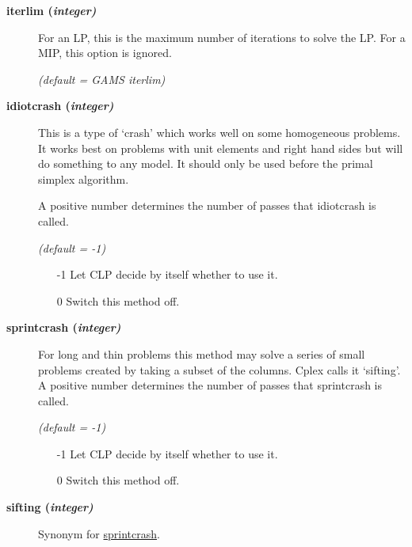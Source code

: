 \begin{description}

\item[\label{iterlim}\hypertarget{iterlim}
{\textbf{iterlim (\slshape{integer})}}]\hspace{1.0in}

For an LP, this is the maximum number of iterations to solve the LP.
For a MIP, this option is ignored.

\textsl{(default = GAMS iterlim)}

\item[\label{idiotcrash}\hypertarget{idiotcrash}
{\textbf{idiotcrash (\slshape{integer})}}]\hspace{1.0in}

This is a type of `crash' which works well on some homogeneous problems.
It works best on problems with unit elements and right hand sides but will do something to any model.
It should only be used before the primal simplex algorithm.

A positive number determines the number of passes that idiotcrash is called.

\textsl{(default = -1)}
\begin{itemize}
\item[-1] 
Let CLP decide by itself whether to use it.
\item[0] 
Switch this method off.
\end{itemize}

\item[\label{sprintcrash}\hypertarget{sprintcrash}
{\textbf{sprintcrash (\slshape{integer})}}]\hspace{1.0in}

For long and thin problems this method may solve a series of small problems created by taking a subset of the columns.
Cplex calls it `sifting'.
A positive number determines the number of passes that sprintcrash is called.

\textsl{(default = -1)}
\begin{itemize}
\item[-1] 
Let CLP decide by itself whether to use it.
\item[0] 
Switch this method off.
\end{itemize}

\item[\label{sifting}\hypertarget{sifting}
{\textbf{sifting (\slshape{integer})}}]\hspace{1.0in}

Synonym for \hyperlink{sprintcrash}{sprintcrash}.


\end{description}
